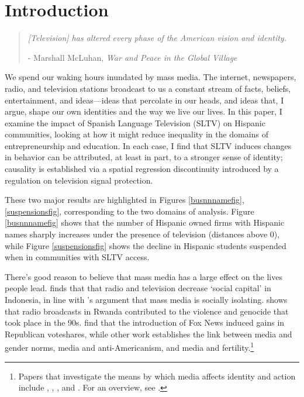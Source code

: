 \documentclass[11pt]{article}
\begin{document}
\pagebreak 
\setcounter{page}{0}


\onehalfspacing


\newpage

\setcounter{page}{1}
\section{Introduction}

\begin{quotation}
\textit{[Television] has altered every phase of the American vision and identity. }
\begin{flushright} - Marshall McLuhan, \textit{War and Peace in the Global Village}\end{flushright}
\end{quotation}

We spend our waking hours inundated by mass media. The internet, newspapers, radio, and television stations broadcast to us a constant stream of facts, beliefs, entertainment, and ideas---ideas that percolate in our heads, and ideas that, I argue, shape our own identities and the way we live our lives. In this paper, I examine the impact of Spanish Language Television (SLTV) on Hispanic communities, looking at how it might reduce inequality in the domains of entrepreneurship and education. In each case, I find that SLTV induces changes in behavior can be attributed, at least in part, to a stronger sense of identity; causality is established via a spatial regression discontinuity introduced by a regulation on television signal protection.

These two major results are highlighted in Figures \ref{busnnnamefig}, \ref{suspensionsfig}, corresponding to the two domains of analysis. Figure \ref{busnnnamefig} shows that the number of Hispanic owned firms with Hispanic names sharply increases under the presence of television (distances above $0$), while Figure \ref{suspensionsfig} shows the decline in Hispanic students suspended when in communities with SLTV access.

There's good reason to believe that mass media has a large effect on the lives people lead. \cite{olken_television_2009} finds that that radio and television decrease `social capital' in Indonesia, in line with \cite{putnam_bowling_2001}'s argument that mass media is socially isolating. \cite{yanagizawa-drott_propaganda_2014} shows that radio broadcasts in Rwanda contributed to the violence and genocide that took place in the 90s. \cite{dellavigna_fox_2007} find that the introduction of Fox News induced gains in Republican voteshares, while other work establishes the link between media and gender norms, media and anti-Americanism, and media and fertility.\footnote{ Papers that investigate the means by which media affects identity and action include \cite{jensen_power_2009}, \cite{gentzkow_media_2004}, \cite{ferrara_soap_2012}, and \cite{kearney_media_2015}. For an overview, see \cite{dellavigna_economic_2015}.}
\end{document}
